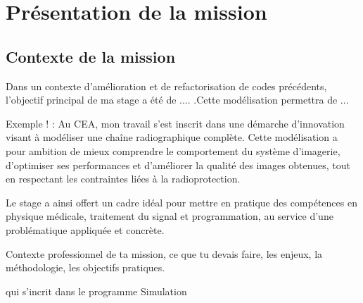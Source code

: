 \documentclass[12pt,a4paper]{report}
\begin{document}
\chapter{Présentation de la mission}
\section{Contexte de la mission}
 Dans un contexte d'amélioration et de refactorisation de codes précédents, l'objectif principal de ma stage a été de .... .Cette modélisation permettra de ...



Exemple ! : Au CEA, mon travail s'est inscrit dans une démarche d'innovation visant à modéliser une chaîne radiographique complète. Cette modélisation a pour ambition de mieux comprendre le comportement du système d'imagerie, d'optimiser ses performances et d'améliorer la qualité des images obtenues, tout en respectant les contraintes liées à la radioprotection.

Le stage a ainsi offert un cadre idéal pour mettre en pratique des compétences en physique médicale, traitement du signal et programmation, au service d'une problématique appliquée et concrète.


Contexte professionnel de ta mission, ce que tu devais faire, les enjeux, la méthodologie, les objectifs pratiques.

qui s'incrit dans le programme Simulation
\end{document}
